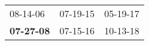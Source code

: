 \begin{supertabular}{p{0.33\columnwidth}p{0.33\columnwidth}p{0.33\columnwidth}}
          08-14-06\textsuperscript{} &  07-19-15\textsuperscript{} &  05-19-17\textsuperscript{} \\
 \textbf{07-27-08\textsuperscript{}} &  07-15-16\textsuperscript{} &  10-13-18\textsuperscript{} \\
\end{supertabular}
